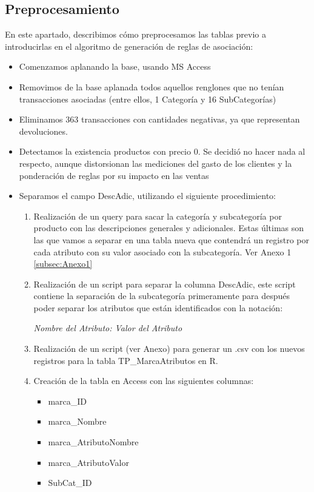 \documentclass[]{article}
\begin{document}
	\subsection{Preprocesamiento}
	En este apartado, describimos cómo preprocesamos las tablas previo a introducirlas en el algoritmo de generación de reglas de asociación:
	\begin{itemize}
		\item Comenzamos aplanando la base, usando MS Access
		\item Removimos de la base aplanada todos aquellos renglones que no tenían transacciones asociadas (entre ellos, 1 Categoría y 16 SubCategorías)
		\item Eliminamos 363 transacciones con cantidades negativas, ya que representan devoluciones.
		\item Detectamos la existencia productos con precio 0. Se decidió no hacer nada al respecto, aunque distorsionan las mediciones del gasto de los clientes y la ponderación de reglas por su impacto en las ventas
		\item Separamos el campo DescAdic, utilizando el siguiente procedimiento:
		\begin{enumerate}
			\item Realización de un query para sacar la categoría y subcategoría por producto con las descripciones generales y adicionales.  Estas últimas son las que vamos a separar en una tabla nueva que contendrá un registro por cada atributo con su valor asociado con la subcategoría. Ver Anexo 1 \ref{subsec:Anexo1}
			
			\item Realización de un script para separar la columna DescAdic, este script contiene la separación de la subcategoría primeramente para después poder separar los atributos que están identificados con la notación:
			\begin{center}
				\textit{Nombre del Atributo: Valor del Atributo}		
			\end{center}
			
			\item Realización de un script (ver Anexo) para generar un .csv con los nuevos registros para la tabla TP\_MarcaAtributos en R.
			
			\item Creación de la tabla en Access con las siguientes columnas:
			\begin{itemize}
				\item marca\_ID
				\item marca\_Nombre
				\item marca\_AtributoNombre
				\item marca\_AtributoValor
				\item SubCat\_ID	
			\end{itemize}	
			
		\end{enumerate}
		
		
	\end{itemize}
	
\end{document}
